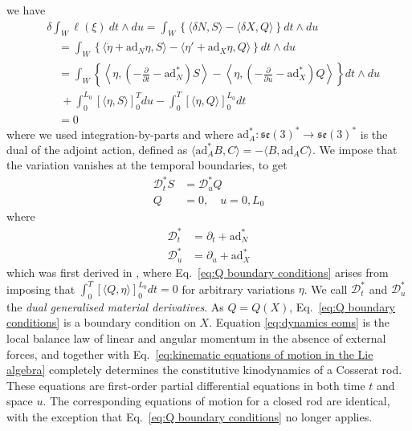 we have
\begin{equation} \label{eq:variation of ell derivation}
\begin{aligned}
& \delta \int_W \ell(\xi)\ dt \wedge du  = \int_W \left\{ \langle  \delta N,  S \rangle  - \langle \delta X, Q \rangle  \right\} dt \wedge du  \\
& \quad = \int_W \left\{   \langle \dot{\eta} + \text{ad}_N \eta, S \rangle  - \langle  \eta' + \text{ad}_X \eta, Q \rangle  \right\}  dt \wedge du \\
& \quad = \int_W \left\{ \left\langle \eta, \left( - \frac{\partial}{\partial t} - \text{ad}_N^* \right) S \right\rangle  - \left\langle  \eta, \left( - \frac{\partial}{\partial u} - \text{ad}_X^* \right) Q \right\rangle  \right\}  dt \wedge du \\
& \quad \ + \int_0^{L_0} \left[ \langle \eta, S \rangle \right]_0^T du - \int_0^T \left[ \langle \eta, Q \rangle \right]_0^{L_0} dt \\
& \quad = 0
\end{aligned}
\end{equation}
where we used integration-by-parts and where $\text{ad}_A^* : \mathfrak{se}(3)^* \to \mathfrak{se}(3)^*$ is the dual of the adjoint action, defined as $\langle \text{ad}_A^* B , C \rangle = -\langle B, \text{ad}_A C \rangle$. We impose that the variation vanishes at the temporal boundaries, to get
\begin{subequations} \label{eq:dynamics eoms}
\begin{align}
\mathcal{D}^*_t S & = \mathcal{D}^*_u Q \\
Q & = 0, \quad u = 0, L_0 \label{eq:Q boundary conditions}
\end{align}
\end{subequations}
where
\begin{subequations}
\begin{align}
\mathcal{D}^*_t & = \partial_t + \text{ad}_N^*  \\
\mathcal{D}^*_u & = \partial_u + \text{ad}_X^* 
\end{align}
\end{subequations}
which was first derived in \citep{holmMatrixGstrands2014, giusteriSimulationViscoelasticCosserat2021}, where Eq.~\ref{eq:Q boundary conditions} arises from imposing that $\int_0^T \left[ \langle Q, \eta \rangle \right]_0^{L_0} dt = 0$ for arbitrary variations $\eta$. We call $\mathcal{D}^*_t$ and $\mathcal{D}^*_u$ the \textit{dual generalised material derivatives}. As $Q = Q(X)$, Eq.~\ref{eq:Q boundary conditions} is a boundary condition on $X$. Equation \ref{eq:dynamics eoms} is the local balance law of linear and angular momentum in the absence of external forces, and together with Eq.~\ref{eq:kinematic equations of motion in the Lie algebra} completely determines the constitutive kinodynamics of a Cosserat rod. These equations are first-order partial differential equations in both time $t$ and space $u$. The corresponding equations of motion for a closed rod are identical, with the exception that Eq.~\ref{eq:Q boundary conditions} no longer applies.

